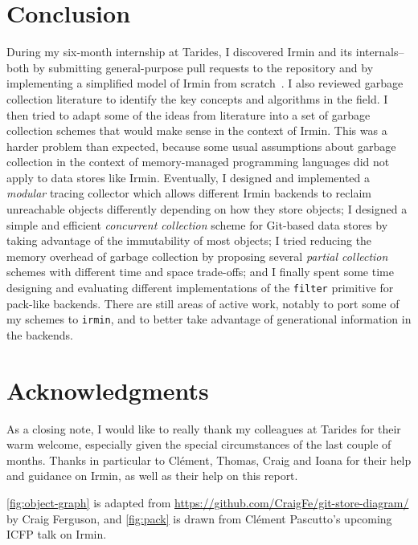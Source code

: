 \section*{Conclusion}

During my six-month internship at Tarides, I discovered Irmin and its internals--both by submitting general-purpose pull requests to the repository and by implementing a simplified model of Irmin from scratch~\cite{irmin-toy-github}. I also reviewed garbage collection literature to identify the key concepts and algorithms in the field. I then tried to adapt some of the ideas from literature into a set of garbage collection schemes that would make sense in the context of Irmin. This was a harder problem than expected, because some usual assumptions about garbage collection in the context of memory-managed programming languages did not apply to data stores like Irmin. Eventually, I designed and implemented a \textit{modular} tracing collector which allows different Irmin backends to reclaim unreachable objects differently depending on how they store objects; I designed a simple and efficient \textit{concurrent collection} scheme for Git-based data stores by taking advantage of the immutability of most objects; I tried reducing the memory overhead of garbage collection by proposing several \textit{partial collection} schemes with different time and space trade-offs; and I finally spent some time designing and evaluating different implementations of the \texttt{filter} primitive for pack-like backends. There are still areas of active work, notably to port some of my schemes to \texttt{irmin}, and to better take advantage of generational information in the backends.

\section*{Acknowledgments}

As a closing note, I would like to really thank my colleagues at Tarides for their warm welcome, especially given the special circumstances of the last couple of months. Thanks in particular to Clément, Thomas, Craig and Ioana for their help and guidance on Irmin, as well as their help on this report.

\cref{fig:object-graph} is adapted from \url{https://github.com/CraigFe/git-store-diagram/} by Craig Ferguson, and \cref{fig:pack} is drawn from Clément Pascutto's upcoming ICFP talk on Irmin.
